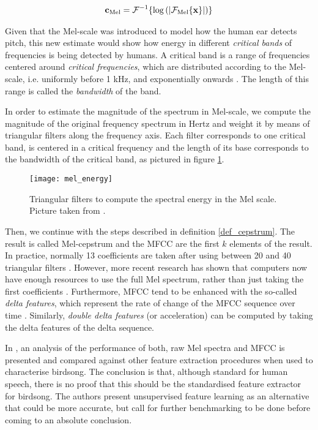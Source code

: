 \documentclass[../main.tex]{subfiles} \label{chapter_soa}
\begin{document}
\begin{align*}
\mathbf{c}_{\text{Mel}} = \mathcal{F}^{-1}\{\log{(\lvert\mathcal{F}_{\text{Mel}}\{\mathbf{x}\}\rvert)}\}
\end{align*}
\par Given that the Mel-scale was introduced to model how the human ear detects pitch, this new estimate would show how energy in different \emph{critical bands} of frequencies is being detected by humans. A critical band is a range of frequencies centered around \emph{critical frequencies}, which are distributed according to the Mel-scale, i.e. uniformly before 1 kHz, and exponentially onwards \cite{Gutierrez-Osuna2009}. The length of this range is called the \emph{bandwidth} of the band.
\par In order to estimate the magnitude of the spectrum in Mel-scale, we compute the magnitude of the original frequency spectrum in Hertz and weight it by means of triangular filters along the frequency axis. Each filter corresponds to one critical band, is centered in a critical frequency and the length of its base corresponds to the bandwidth of the critical band, as pictured in figure \ref{mel_energy}.


\begin{figure}[t]
\texttt{[image: mel\_energy]}
\caption{Triangular filters to compute the spectral energy in the Mel scale. Picture taken from \cite{Sludge2000}.}
\label{mel_energy}
\end{figure}

\par Then, we continue with the steps described in definition \ref{def_cepstrum}. The result is called Mel-cepstrum and the MFCC are the first $k$ elements of the result. In practice, normally 13 coefficients are taken after using between 20 and 40 triangular filters \cite{Gutierrez-Osuna2009}. However, more recent research has shown that computers now have enough resources to use the full Mel spectrum, rather than just taking the first coefficients \cite{Stowell2014}. Furthermore, MFCC tend to be enhanced with the so-called \emph{delta features}, which represent the rate of change of the MFCC sequence over time \cite{Muda2010} \cite{Lyons2014}. Similarly, \emph{double delta features} (or acceleration) can be computed by taking the delta features of the delta sequence. 
\par In \cite{Stowell2014}, an analysis of the performance of both, raw Mel spectra and MFCC is presented and compared against other feature extraction procedures when used to characterise birdsong. The conclusion is that, although standard for human speech, there is no proof that this should be the standardised feature extractor for birdsong. The authors present unsupervised feature learning as an alternative that could be more accurate, but call for further benchmarking to be done before coming to an absolute conclusion.
\end{document}
